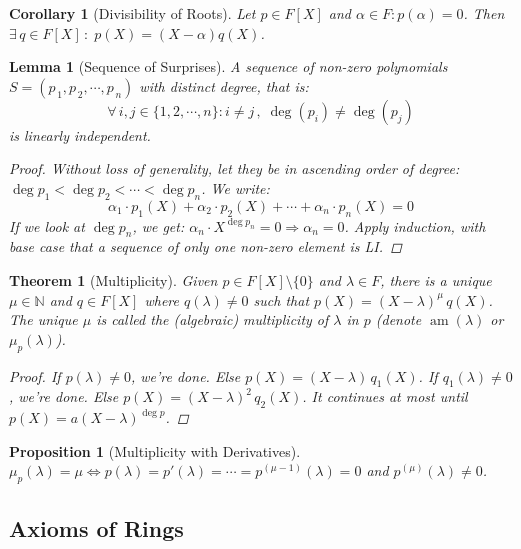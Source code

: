 \documentclass[12pt]{article}
\let\RA\Rightarrow
\let\LR\Leftrightarrow
\newcommand{\Forall}[1]{\forall\,{#1}\,,\;}
\newcommand{\Exist}[1]{\exists\,{#1}\,:\;}
\newcommand{\seq}[2]{\left({#1}_{\,1},{#1}_{\,2},\cdots,{#1}_{\,#2}\right)}
\DeclareMathOperator{\am}{am}
\newtheorem{theorem}{Theorem}[subsection]
\newtheorem{lemma}{Lemma}[subsection]
\newtheorem{proposition}{Proposition}[subsection]
\newtheorem{corollary}{Corollary}[subsection]
\begin{document}
\begin{corollary}[Divisibility of Roots]
  Let $p\in F[X]$ and $\alpha\in F: p(\alpha)=0$. Then $\Exist{q\in F[X]} p(X)=(X-\alpha)q(X)$.
\end{corollary}

\begin{lemma}[Sequence of Surprises]
  A sequence of non-zero polynomials $S=\seq{p}{n}$ with distinct degree, that is: $$\Forall{i,j\in \{1,2,\cdots,n\}:i\neq j} \deg(p_i)\neq \deg(p_j)$$ is linearly independent.
  \begin{proof}
    Without loss of generality, let they be in ascending order of degree: $\deg p_1<\deg p_2<\cdots<\deg p_n$. We write: $$\alpha_1\cdot p_1(X)+\alpha_2\cdot p_2(X)+\cdots+\alpha_n\cdot p_n(X)=0$$
    If we look at $\deg p_n$, we get: $\alpha_n\cdot X^{\deg p_n}=0\RA \alpha_n=0$. Apply induction, with base case that a sequence of only one non-zero element is LI.
  \end{proof}
\end{lemma}

\begin{theorem}[Multiplicity]
  Given $p\in F[X]\setminus\{0\}$ and $\lambda\in F$, there is a unique $\mu\in\mathbb{N}$ and $q\in F[X]$ where $q(\lambda)\neq 0$ such that $p(X)=(X-\lambda)^\mu\,q(X)$. The unique $\mu$ is called the (algebraic) multiplicity of $\lambda$ in $p$ (denote $\am(\lambda)$ or $\mu_p(\lambda)$).
  \begin{proof}
    If $p(\lambda)\neq 0$, we're done. Else $p(X)=(X-\lambda)\,q_1(X)$. If $q_1(\lambda)\neq 0$, we're done. Else $p(X)=(X-\lambda)^2\,q_2(X)$. It continues at most until $p(X)=a(X-\lambda)^{\deg p}$.
  \end{proof}
\end{theorem}

\begin{proposition}[Multiplicity with Derivatives]
  $\mu_p(\lambda)=\mu\LR p(\lambda)=p'(\lambda)=\cdots=p^{(\mu-1)}(\lambda)=0$ and $p^{(\mu)}(\lambda)\neq 0$.
\end{proposition}

\subsection{Axioms of Rings}
\end{document}
